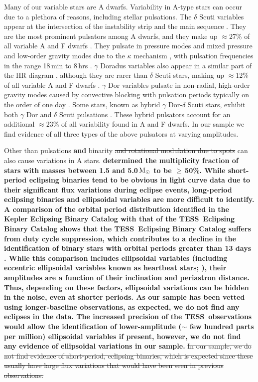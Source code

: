 \documentclass[twocolumn, linenumbers]{aastex631}
\newcommand{\tess}{TESS}
\begin{document}
Many of our variable stars are A dwarfs.  Variability in A-type stars can occur due to a plethora of reasons, including stellar pulsations.  The $\delta$ Scuti variables appear at the intersection of the instability strip and the main sequence \citep[e.g.,][]{Petit1987}.  They are the most prominent pulsators among A dwarfs, and they make up $\approx$27\% of all variable A and F dwarfs \citep{Uytterhoeven2011}. They pulsate in pressure modes and mixed pressure and low-order gravity modes due to the $\kappa$ mechanism \citep{Lee1985}, with pulsation frequencies in the range 18\,min to 8\,hrs \citep{Amado2004}. $\gamma$ Doradus variables also appear in a similar part of the HR diagram \citep[e.g.,][]{Kaye1999}, although they are rarer than $\delta$ Scuti stars, making up $\approx$12\% of all variable A and F dwarfs \citep{Uytterhoeven2011}. $\gamma$ Dor variables pulsate in non-radial, high-order gravity modes caused by convective blocking \citep{Guzik2000} with pulsation periods typically on the order of one day \citep{Grigahcene2010}.  Some stars, known as hybrid $\gamma$ Dor-$\delta$ Scuti stars, exhibit both $\gamma$ Dor and $\delta$ Scuti pulsations \citep{Grigahcene2010}.  These hybrid pulsators account for an additional $\approx$23\% of all variability found in A and F dwarfs. In our sample we find evidence of all three types of the above pulsators at varying amplitudes. 


Other than pulsations \textbf{and} binarity {\st{and rotational modulation due to spots}} can also cause variations in A stars. {\bf{\citet{Duchene2013} determined the multiplicity fraction of stars with masses between 1.5 and 5.0\,{{$\rm M_{\odot}$}} to be $\ge$\,50\%. While short-period eclipsing binaries tend to be obvious in light curve data due to their significant flux variations during eclipse events, long-period eclipsing binaries and ellipsoidal variables are more difficult to identify. A comparison of the orbital period distribution identified in the Kepler Eclipsing Binary Catalog \citep{Kirk2016} with that of the \tess\ Eclipsing Binary Catalog \citep{Prsa2021} shows that the \tess\ Eclipsing Binary Catalog suffers from duty cycle suppression, which contributes to a decline in the identification of binary stars with orbital periods greater than 13 days \citep{Prsa2021}. While this comparison includes ellipsoidal variables (including eccentric ellipsoidal variables known as heartbeat stars; \citealt{Thompson2012}), their amplitudes are a function of their inclination and periastron distance. Thus, depending on these factors, ellipsoidal variations can be hidden in the noise, even at shorter periods. As our sample has been vetted using longer-baseline observations, as expected, we do not find any eclipses in the data. The increased precision of the \tess\ observations would allow the identification of lower-amplitude ($\sim$ few hundred parts per million) ellipsoidal variables if present, however, we do not find any evidence of ellipsoidal variations in our sample.}}
{\st{In our sample, we do not find evidence of short-period, eclipsing binaries, which is expected since these usually have large flux variations that would have been seen in previous observations.}} 
\end{document}
